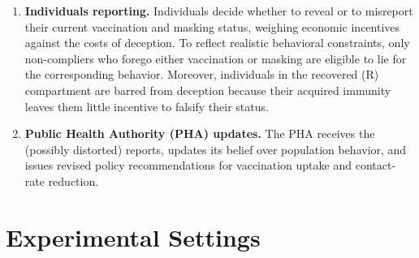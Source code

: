 \documentclass[sigconf,review]{acmart}
\begin{document}
\begin{enumerate}
\item {\bf Individuals reporting.} Individuals decide whether to reveal or to misreport their current vaccination and masking status, weighing economic incentives against the costs of deception. To reflect realistic behavioral constraints, only non-compliers who forego either vaccination or masking are eligible to lie for the corresponding behavior. Moreover, individuals in the recovered (R) compartment are barred from deception because their acquired immunity leaves them little incentive to falsify their status.

\item {\bf Public Health Authority (PHA) updates.} The PHA receives the (possibly distorted) reports, updates its belief over population behavior, and issues revised policy recommendations for vaccination uptake and contact-rate reduction.
\end{enumerate}


\section{Experimental Settings}
\label{supp:settings} 

\end{document}
